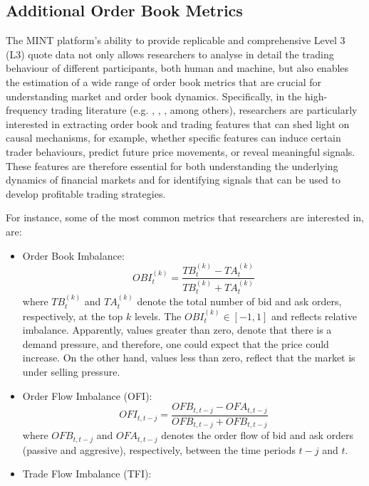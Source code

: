 \subsection{Additional Order Book Metrics}
The MINT platform’s ability to provide replicable and comprehensive Level 3 (L3) quote data not only allows researchers to analyse in detail the trading behaviour of different participants, both human and machine, but also enables the estimation of a wide range of order book metrics that are crucial for understanding market and order book dynamics. Specifically, in the high-frequency trading literature (e.g. \cite{cont2014price}, \cite{ait2022}, \cite{cordoni2024consistent}, \cite{jonuzaj2025} among others), researchers are particularly interested in extracting order book and trading features that can shed light on causal mechanisms, for example, whether specific features can induce certain trader behaviours, predict future price movements, or reveal meaningful signals. These features are therefore essential for both understanding the underlying dynamics of financial markets and for identifying signals that can be used to develop profitable trading strategies.

For instance, some of the most common metrics that researchers are interested in, are:
\begin{itemize}
	\item Order Book Imbalance: 
	\begin{equation*}
	OBI^{(k)}_{t} = \frac{TB^{(k)}_{t} - TA^{(k)}_{t}}{TB^{(k)}_{t}+TA^{(k)}_{t}}
	\end{equation*}
	where $TB^{(k)}_{t}$ and  $TA^{(k)}_{t}$ denote the total number of bid and ask orders, respectively, at the top 	$k$ levels. The $OBI^{(k)}_{t} \in [-1,1]$ and reflects relative imbalance. Apparently, values greater than zero, 	denote that there is a demand pressure, and therefore, one could expect that the price could increase. On the 	other hand, values less than zero, reflect that the market is under selling pressure.
	\item Order Flow Imbalance (OFI):
	\begin{equation*}
	OFI_{t,t-j} = \frac{OFB_{t,t-j} - OFA_{t,t-j}}{OFB_{t,t-j}+OFB_{t,t-j}}
	\end{equation*}
	where $OFB_{t,t-j}$ and $OFA_{t,t-j}$  denotes the order flow of bid and ask orders (passive and aggresive), 	respectively, between the time periods $t-j$ and $t$.
	\item Trade Flow Imbalance (TFI):
\end{itemize}

